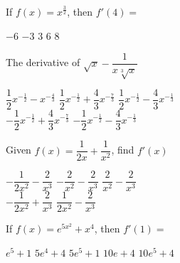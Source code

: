 \begin{questions}
    \question If $f(x) = x^\frac{3}{2}$, then $f'(4) = $ \\
    
    \begin{oneparchoices}
        \choice $-6$ 
        \choice $-3$ 
        \choice $3$
        \choice $6$
        \choice $8$
    \end{oneparchoices} \par \horizontalline

    \question The derivative of $\sqrt x - \dfrac{1}{x\sqrt[3]{x}}$ \\

    \begin{oneparchoices}
        \choice $\dfrac{1}{2}x^{-\frac{1}{2}} - x^{-\frac{4}{3}}$
        \choice $\dfrac{1}{2}x^{-\frac{1}{2}} + \dfrac{4}{3}x^{-\frac{7}{3}}$ 
        \choice $\dfrac{1}{2}x^{-\frac{1}{2}} - \dfrac{4}{3}x^{-\frac{1}{3}}$ \\[11pt]
        \makebox[0.2 \textwidth] \choice $-\dfrac{1}{2}x^{-\frac{1}{2}} + \dfrac{4}{3}x^{-\frac{7}{3}}$ 
        \makebox[0.25 \textwidth] \choice $-\dfrac{1}{2}x^{-\frac{1}{2}} - \dfrac{4}{3}x^{-\frac{1}{3}}$
    \end{oneparchoices} \par \horizontalline

    \question Given $f(x) = \dfrac{1}{2x} + \dfrac{1}{x^2}$, find $f'(x)$ \\

    \begin{oneparchoices}
        \choice $-\dfrac{1}{2x^2} - \dfrac{2}{x^3}$ 
        \choice $-\dfrac{2}{x^2} - \dfrac{2}{x^3}$
        \choice $\dfrac{2}{x^2} - \dfrac{2}{x^3}$ \\[11pt]
        \makebox[0.23 \textwidth] \choice $-\dfrac{1}{2x^2} + \dfrac{2}{x^3}$
        \makebox[0.29 \textwidth] \choice $\dfrac{1}{2x^2} - \dfrac{2}{x^3}$
    \end{oneparchoices} \par \horizontalline

    \question If $f(x) = e^{5x^2} + x^4$, then $f'(1) = $ \\

    \begin{oneparchoices}
        \choice $e^5 + 1$
        \choice $5e^4 + 4$ 
        \choice $5e^5 + 1$
        \choice $10e + 4$
        \choice $10e^5 + 4$
    \end{oneparchoices} \par \horizontalline


\end{questions}
